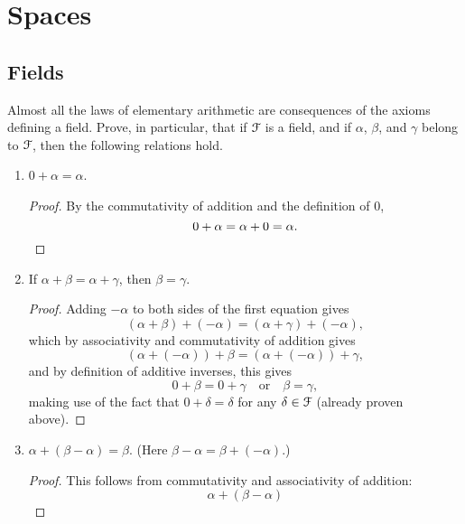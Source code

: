 \chapter{Spaces}

\section{Fields}

 Almost all the laws of elementary arithmetic are
consequences of the axioms defining a field. Prove, in particular,
that if $\mathcal{F}$ is a field, and if $\alpha$, $\beta$, and $\gamma$ belong
to $\mathcal{F}$, then the following relations hold.
\label{exercise:field-properties}
\begin{enumerate}
\item $0 + \alpha = \alpha$.
  \begin{proof}
    By the commutativity of addition and the definition of $0$,
    \begin{equation*}
      0 + \alpha = \alpha + 0 = \alpha. \qedhere
    \end{equation*}
  \end{proof}
\item If $\alpha + \beta = \alpha + \gamma$, then $\beta = \gamma$.
  \begin{proof}
    Adding $-\alpha$ to both sides of the first equation gives
    \begin{equation*}
      (\alpha + \beta) + (-\alpha) = (\alpha + \gamma) + (-\alpha),
    \end{equation*}
    which by associativity and commutativity of addition gives
    \begin{equation*}
      (\alpha + (-\alpha)) + \beta = (\alpha + (-\alpha)) + \gamma,
    \end{equation*}
    and by definition of additive inverses, this gives
    \begin{equation*}
      0 + \beta = 0 + \gamma
      \quad\text{or}\quad
      \beta = \gamma,
    \end{equation*}
    making use of the fact that $0 + \delta = \delta$ for any
    $\delta\in\mathcal{F}$ (already proven above).
  \end{proof}
\item $\alpha + (\beta - \alpha) = \beta$. (Here
  $\beta - \alpha = \beta + (-\alpha)$.)
  \begin{proof}
    This follows from commutativity and associativity of addition:
    \begin{equation*}
      \alpha + (\beta - \alpha)

\end{equation*}
\end{proof}
\end{enumerate}
